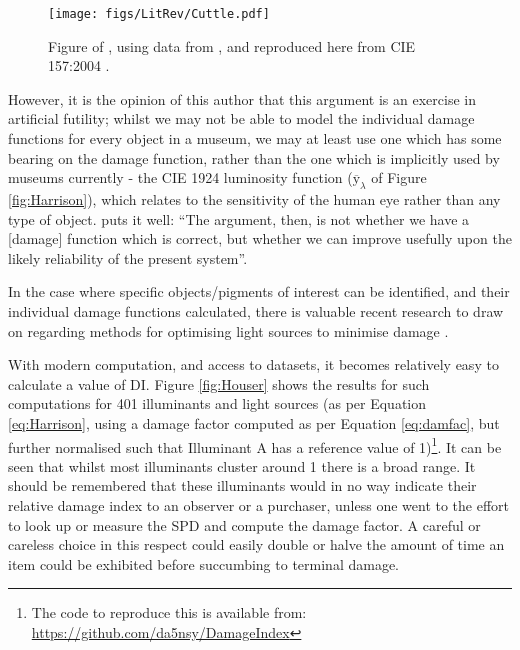 \begin{figure}[htbp]
\texttt{[image: figs/LitRev/Cuttle.pdf]}
\caption{Figure of \citet{cuttle_control_1999}, using data from \citet{saunders_wavelength-dependent_1994}, and reproduced here from CIE 157:2004 \citep{cie_cie_2004}.}
\label{fig:Cuttle}
\end{figure}

However, it is the opinion of this author that this argument is an exercise in artificial futility; whilst we may not be able to model the individual damage functions for every object in a museum, we may at least use one which has some bearing on the damage function, rather than the one which is implicitly used by museums currently - the CIE 1924 luminosity function ($\overline{\mathrm{y}}_{\lambda}$ of Figure \ref{fig:Harrison}), which relates to the sensitivity of the human eye rather than any type of object. \citet{cuttle_lighting_1988} puts it well: ``The argument, then, is not whether we have a [damage] function which is correct, but whether we can improve usefully upon the likely reliability of the present system''.

In the case where specific objects/pigments of interest can be identified, and their individual damage functions calculated, there is valuable recent research to draw on regarding methods for optimising light sources to minimise damage \citep{durmus_optimising_2017,durmus_colour_2015,durmus_optimising_2015,durmus_object_2017}.

With modern computation, and access to datasets, it becomes relatively easy to calculate a value of \Gls{DI}. Figure \ref{fig:Houser} shows the results for such computations for 401 illuminants and light sources (as per Equation \ref{eq:Harrison}, using a damage factor computed as per Equation \ref{eq:damfac}, but further normalised such that Illuminant A has a reference value of 1)\footnote{The code to reproduce this is available from: \url{https://github.com/da5nsy/DamageIndex}}. It can be seen that whilst most illuminants cluster around 1 there is a broad range. It should be remembered that these illuminants would in no way indicate their relative damage index to an observer or a purchaser, unless one went to the effort to look up or measure the \gls{SPD} and compute the damage factor. A careful or careless choice in this respect could easily double or halve the amount of time an item could be exhibited before succumbing to terminal damage.

